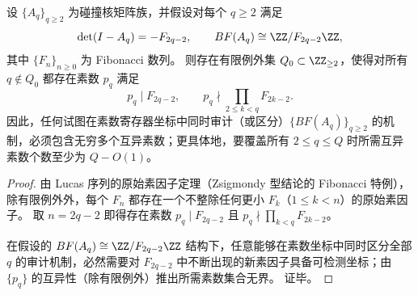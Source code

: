\begin{proposition}\label{prop:pom-collision-aq-fibonacci-bf-primitive-prime-divisor}
设 \(\{A_q\}_{q\ge 2}\) 为碰撞核矩阵族，并假设对每个 \(q\ge 2\) 满足
\[
\det(I-A_q)=-F_{2q-2},
\qquad
BF(A_q)\cong \ZZ/F_{2q-2}\ZZ,
\]
其中 \(\{F_n\}_{n\ge 0}\) 为 Fibonacci 数列。
则存在有限例外集 \(Q_0\subset\ZZ_{\ge 2}\)，使得对所有 \(q\notin Q_0\) 都存在素数 \(p_q\) 满足
\[
p_q\mid F_{2q-2},
\qquad
p_q\nmid \prod_{2\le k<q}F_{2k-2}.
\]
因此，任何试图在素数寄存器坐标中同时审计（或区分）\(\{BF(A_q)\}_{q\ge 2}\) 的机制，必须包含无穷多个互异素数；更具体地，要覆盖所有 \(2\le q\le Q\) 时所需互异素数个数至少为 \(Q-O(1)\)。
\end{proposition}

\begin{proof}
由 Lucas 序列的原始素因子定理（Zsigmondy 型结论的 Fibonacci 特例），除有限例外外，每个 \(F_n\) 都存在一个不整除任何更小 \(F_k\)（\(1\le k<n\)）的原始素因子。
取 \(n=2q-2\) 即得存在素数 \(p_q\mid F_{2q-2}\) 且 \(p_q\nmid \prod_{k<q}F_{2k-2}\)。
\par
在假设的 \(BF(A_q)\cong \ZZ/F_{2q-2}\ZZ\) 结构下，任意能够在素数坐标中同时区分全部 \(q\) 的审计机制，必然需要对 \(F_{2q-2}\) 中不断出现的新素因子具备可检测坐标；由 \(\{p_q\}\) 的互异性（除有限例外）推出所需素数集合无界。
证毕。
\end{proof}

\endinput

